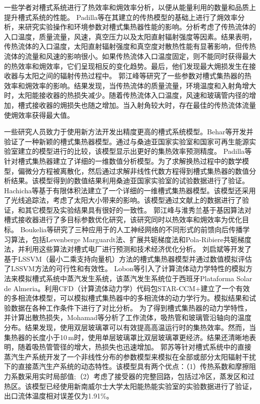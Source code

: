 一些学者对槽式系统进行了热效率和㶲效率分析，以便从能量利用的数量和品质上提升槽式系统的性能。
Padilla等\cite{Padilla2014}在其建立的传热模型\cite{Padilla2011}的基础上进行了㶲效率分析，来研究实验操作和环境参数对槽式集热器性能的影响。分析考虑了传热流体的入口温度，质量流量，风速，真空压力以及太阳直射辐射强度等因素。结果表明，传热流体的入口温度，太阳直射辐射强度和真空度对散热性能有显著影响，但传热流体的流量和风速的影响很小。如果传热流体入口温度固定，则不能同时获得最大的热效率和㶲效率，它们呈现相反的变化趋势。最后，他们发现最大㶲损发生在接收器与太阳之间的辐射传热过程中。
郭江峰等\cite{JiangfengGuo2016-1}研究了一些参数对槽式集热器的热效率和㶲效率的影响。结果发现，当传热流体的质量流量，环境温度和入射角增大时，太阳能接收器的热损失减少。随着传热流体入口温度，风速和玻璃管内径的增加，槽式接收器的㶲损失也随之增加。当入射角较大时，存在最佳的传热流体流量使㶲效率获得最大值。

一些研究人员致力于使用新方法开发出精度更高的槽式系统模型。Behar等\cite{Behar2015}开发并验证了一种新颖的槽式集热器模型。通过与桑迪亚国家实验室和国家可再生能源实验室建立的模型进行的比较，该模型显示出更好的集热效率预测精度。
Padilla等\cite{Padilla2011}针对槽式集热器建立了详细的一维数值分析模型。为了求解换热过程中的数学模型，偏微分方程被离散化，然后通过求解非线性代数方程得到槽式集热器的数值分析结果。该模型得到的数值结果利用桑迪亚国家实验室的试验数据进行了验证。
Hachicha等\cite{Hachicha2013}基于有限体积法建立了一个详细的一维槽式集热器模型。该模型还采用了光线追踪法，考虑了太阳大小带来的影响。该模型通过文献上的数据进行了验证，和其它模型及实验结果具有很好的一致性。
郭江峰与淮秀兰\cite{JiangfengGuo2016-2}基于基因算法对槽式接收器进行了多目标参数优化研究，该研究同时以热效率和㶲效率为优化目标。
Boukelia等\cite{Boukelia2016}研究了三种应用于的人工神经网络的不同形式的前馈向后传播学习算法，包括Levenberge Marguardt法、扩展共轭梯度法和Pola-Ribiere共轭梯度法，并利用这些算法对槽式电厂进行预测和技术经济优化分析。
刘启斌等\cite{Liu2012}开发了基于LSSVM（最小二乘支持向量机）方法的槽式集热器模型并通过数值模拟评估了LSSVM方法的可行性和有效性。
Lobon等\cite{Lobon2014}引入了计算流体动力学特性的模拟方法来模拟槽式系统中蒸汽发生系统，该蒸汽发生系统位于西班牙Plataforma Solar de Almeria。利用CFD（计算流体动力学）代码包STAR-CCM+建立了一个有效的多相流体模型，可以模拟槽式集热器中的多相流体的动力学行为。模拟结果和试验数据在各种工作条件下进行了对比分析。
为了得到槽式集热器的动力学特性，并计算出散热损失，Mohamad等\cite{Mohamad2014}分析了工作流体，吸热管和玻璃管沿轴向的温度分布。结果发现，使用双层玻璃罩可以有效提高高温运行时的集热效率。然而，当集热器的长度小于10$\,\mathrm{m}$时，使用单层玻璃罩比双层玻璃罩更经济。结果还清晰地表明，随着吸热管管径的增大，热损失也迅速增加。
郭苏等\cite{SuGuo2016}针对槽式系统中的直接蒸汽生产系统开发了一个非线性分布的参数模型来模拟在全部或部分太阳辐射干扰下的直接蒸汽生产系统的动态特性。该模型具有两个优点：（1）传热系数和摩擦阻力系数采用实时局部值;（2）考虑了接受器的完整回路，包括过冷区，蒸发区和过热区。该模型已经使用新南威尔士大学太阳能热能实验室的实验数据进行了验证，出口流体温度相对误差仅为1.91\%。

